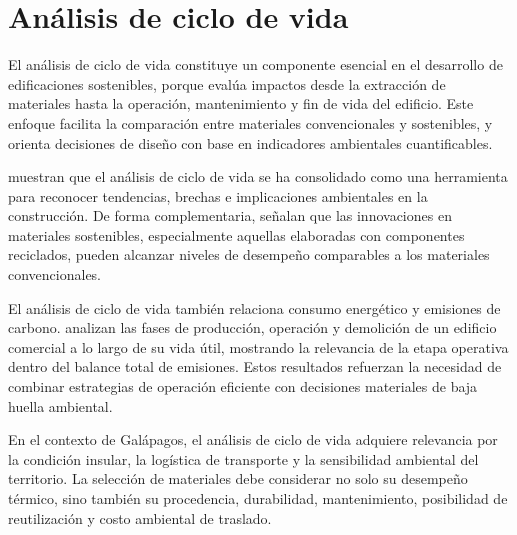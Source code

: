 \section{Análisis de ciclo de vida}

\begin{textoDosTercios}

El análisis de ciclo de vida constituye un componente esencial en el desarrollo de edificaciones sostenibles, porque evalúa impactos desde la extracción de materiales hasta la operación, mantenimiento y fin de vida del edificio. Este enfoque facilita la comparación entre materiales convencionales y sostenibles, y orienta decisiones de diseño con base en indicadores ambientales cuantificables.

\textcite{moutikLifeCycleAssessment2023} muestran que el análisis de ciclo de vida se ha consolidado como una herramienta para reconocer tendencias, brechas e implicaciones ambientales en la construcción. De forma complementaria, \textcite{firooziEmergingTrendsSustainable2024} señalan que las innovaciones en materiales sostenibles, especialmente aquellas elaboradas con componentes reciclados, pueden alcanzar niveles de desempeño comparables a los materiales convencionales.

El análisis de ciclo de vida también relaciona consumo energético y emisiones de carbono. \textcite{zhaoCaseStudyCalculation2025} analizan las fases de producción, operación y demolición de un edificio comercial a lo largo de su vida útil, mostrando la relevancia de la etapa operativa dentro del balance total de emisiones. Estos resultados refuerzan la necesidad de combinar estrategias de operación eficiente con decisiones materiales de baja huella ambiental.

En el contexto de Galápagos, el análisis de ciclo de vida adquiere relevancia por la condición insular, la logística de transporte y la sensibilidad ambiental del territorio. La selección de materiales debe considerar no solo su desempeño térmico, sino también su procedencia, durabilidad, mantenimiento, posibilidad de reutilización y costo ambiental de traslado.

\end{textoDosTercios}

